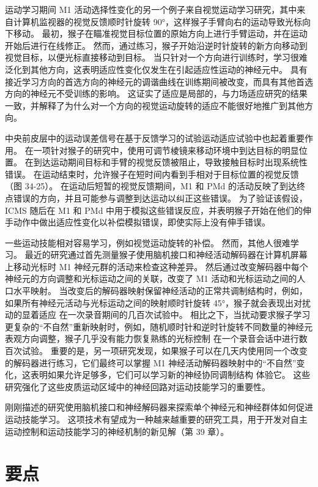 运动学习期间 M1 活动选择性变化的另一个例子来自视觉运动学习研究，其中来自计算机监视器的视觉反馈顺时针旋转 90°，这样猴子手臂向右的运动导致光标向下移动。 最初，猴子在瞄准视觉目标位置的原始方向上进行手臂运动，并在运动开始后进行在线修正。 然而，通过练习，猴子开始沿逆时针旋转的新方向移动到视觉目标，以便光标直接移动到目标。 当只针对一个方向进行训练时，学习很难泛化到其他方向，这表明适应性变化仅发生在引起适应性运动的神经元中。 具有接近学习方向的首选方向的神经元的调谐曲线在训练期间被改变，而具有其他首选方向的神经元不受训练的影响。 这证实了适应是局部的，与力场适应研究的结果一致，并解释了为什么对一个方向的视觉运动旋转的适应不能很好地推广到其他方向。

中央前皮层中的运动误差信号在基于反馈学习的试验运动适应试验中也起着重要作用。 在一项针对猴子的研究中，使用可调节棱镜来移动环境中到达目标的明显位置。 在到达运动期间目标和手臂的视觉反馈被阻止，导致接触目标时出现系统性错误。 在运动结束时，允许猴子在短时间内看到手相对于目标位置的视觉反馈（图 34-25）。 在运动后短暂的视觉反馈期间，M1 和 PMd 的活动反映了到达终点错误的方向，并且可能参与调整到达运动以纠正这些错误。 为了验证该假设，ICMS 随后在 M1 和 PMd 中用于模拟这些错误反应，并表明猴子开始在他们的伸手动作中做出适应性变化以补偿模拟错误，即使实际上没有伸手错误。

一些运动技能相对容易学习，例如视觉运动旋转的补偿。 然而，其他人很难学习。 最近的研究通过首先测量猴子使用脑机接口和神经活动解码器在计算机屏幕上移动光标时 M1 神经元群的活动来检查这种差异。 然后通过改变解码器中每个神经元的方向调整和光标运动之间的关联，改变了 M1 活动和光标运动之间的人口水平映射。 当改变后的解码器映射保留神经活动的正常共调制结构时，例如，如果所有神经元活动与光标运动之间的映射顺时针旋转 45°，猴子就会表现出对扰动的显着适应 在一次录音期间的几百次试验中。 相比之下，当扰动要求猴子学习更复杂的“不自然”重新映射时，例如，随机顺时针和逆时针旋转不同数量的神经元表观方向调整，猴子几乎没有能力恢复熟练的光标控制 在一个录音会话中进行数百次试验。 重要的是，另一项研究发现，如果猴子可以在几天内使用同一个改变的解码器进行练习，它们最终可以掌握 M1 神经活动解码器映射中的“不自然”变化，这表明如果允许足够多，它们可以学习新的神经协同调制结构 体验它。 这些研究强化了这些皮质运动区域中的神经回路对运动技能学习的重要性。

刚刚描述的研究使用脑机接口和神经解码器来探索单个神经元和神经群体如何促进运动技能学习。 这项技术有望成为一种越来越重要的研究工具，用于开发对自主运动控制和运动技能学习的神经机制的新见解（第 39 章）。


\section{要点}

